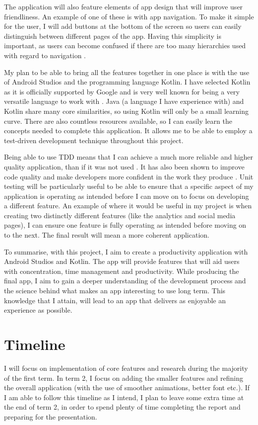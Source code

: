 \documentclass[12pt]{article}
\begin{document}
The application will also feature elements of app design that will improve user friendliness. An example of one of these is with app navigation. To make it simple for the user, I will add buttons at the bottom of the screen so users can easily distinguish between different pages of the app. Having this simplicity is important, as users can become confused if there are too many hierarchies used with regard to navigation \cite{four}. 

My plan to be able to bring all the features together in one place is with the use of Android Studios and the programming language Kotlin. I have selected Kotlin as it is officially supported by Google and is very well known for being a very versatile language to work with \cite{five}. Java (a language I have experience with) and Kotlin share many core similarities, so using Kotlin will only be a small learning curve.  There are also countless resources available, so I can easily learn the concepts needed to complete this application. It allows me to be able to employ a test-driven development technique throughout this project.

Being able to use TDD means that I can achieve a much more reliable and higher quality application, than if it was not used \cite{six}. It has also been shown to improve code quality \cite{seven} and make developers more confident in the work they produce \cite{eight}. Unit testing will be particularly useful to be able to ensure that a specific aspect of my application is operating as intended before I can move on to focus on developing a different feature. An example of where it would be useful in my project is when creating two distinctly different features (like the analytics and social media pages), I can ensure one feature is fully operating as intended before moving on to the next. The final result will mean a more coherent application.

To summarise, with this project, I aim to create a productivity application with Android Studios and Kotlin. The app will provide features that will aid users with concentration, time management and productivity. While producing the final app, I aim to gain a deeper understanding of the development process and the science behind what makes an app interesting to use long term. This knowledge that I attain, will lead to an app that delivers as enjoyable an experience as possible.

\section{Timeline}
I will focus on implementation of core features and research during the majority of the first term. In term 2, I focus on adding the smaller features and refining the overall application (with the use of smoother animations, better font etc.). If I am able to follow this timeline as I intend, I plan to leave some extra time at the end of term 2, in order to spend plenty of time completing the report and preparing for the presentation.
\end{document}

